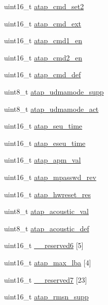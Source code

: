 \begin{DoxyCompactItemize}
\item 
uint16\_\-t \hyperlink{structataparams_a31b1a594d5772b22d8f2a2dab301b361}{atap\_\-cmd\_\-set2}
\item 
uint16\_\-t \hyperlink{structataparams_ab70abba1ac7343ede074b831a8bfcbe2}{atap\_\-cmd\_\-ext}
\item 
uint16\_\-t \hyperlink{structataparams_a9b54acc5406975bf0df4508e4c9ac6f7}{atap\_\-cmd1\_\-en}
\item 
uint16\_\-t \hyperlink{structataparams_a61a18978f96b635f8fe077b7990297d6}{atap\_\-cmd2\_\-en}
\item 
uint16\_\-t \hyperlink{structataparams_a985f873f16a5c96ca418eed23cb97c7a}{atap\_\-cmd\_\-def}
\item 
uint8\_\-t \hyperlink{structataparams_a50f15151b8e9e897f18e693c9f1d2e43}{atap\_\-udmamode\_\-supp}
\item 
uint8\_\-t \hyperlink{structataparams_a5774eaa4ffc2f87ed698c2386a23903a}{atap\_\-udmamode\_\-act}
\item 
uint16\_\-t \hyperlink{structataparams_afad2611c0b5c3000e0b66f3e849a3d95}{atap\_\-seu\_\-time}
\item 
uint16\_\-t \hyperlink{structataparams_a381d694329ee8b671198aee642813e10}{atap\_\-eseu\_\-time}
\item 
uint16\_\-t \hyperlink{structataparams_a0329123f3f4d1ab02c011c488ac2a8f7}{atap\_\-apm\_\-val}
\item 
uint16\_\-t \hyperlink{structataparams_abc12ecd49ac95b92b80a26ee19b0905f}{atap\_\-mpasswd\_\-rev}
\item 
uint16\_\-t \hyperlink{structataparams_aeae5b21453e8911f9501e724fe87c973}{atap\_\-hwreset\_\-res}
\item 
uint8\_\-t \hyperlink{structataparams_a186fc5cda299f5db2caa32533bf66152}{atap\_\-acoustic\_\-val}
\item 
uint8\_\-t \hyperlink{structataparams_aa2522161a1d4f2b8541447bcbfb83193}{atap\_\-acoustic\_\-def}
\item 
uint16\_\-t \hyperlink{structataparams_acd422c41ebd7919a6d8f6dc3a0256c70}{\_\-\_\-reserved6} \mbox{[}5\mbox{]}
\item 
uint16\_\-t \hyperlink{structataparams_a57faa79563073874cb15df727d4417eb}{atap\_\-max\_\-lba} \mbox{[}4\mbox{]}
\item 
uint16\_\-t \hyperlink{structataparams_a26d5387e4f7b71fb8a18c96deaae7485}{\_\-\_\-reserved7} \mbox{[}23\mbox{]}
\item 
uint16\_\-t \hyperlink{structataparams_aa8469068118b635653205ab343552c7c}{atap\_\-rmsn\_\-supp}

\end{DoxyCompactItemize}
